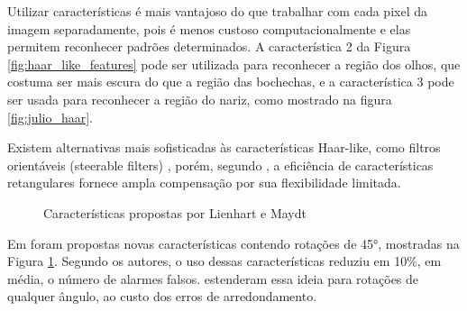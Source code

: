 Utilizar características é mais vantajoso do que trabalhar com cada pixel da imagem separadamente, pois é menos custoso computacionalmente e elas permitem reconhecer padrões determinados. A característica 2 da Figura \ref{fig:haar_like_features} pode ser utilizada para reconhecer a região dos olhos, que costuma ser mais escura do que a região das bochechas, e a característica 3 pode ser usada para reconhecer a região do nariz, como mostrado na figura \ref{fig:julio_haar}.

Existem alternativas mais sofisticadas às características Haar-like, como filtros orientáveis (steerable filters) \cite{freeman1991design} \cite{greenspan1994overcomplete}, porém, segundo , a eficiência de características retangulares fornece ampla compensação por sua flexibilidade limitada.

\begin{figure}[htbp]
   \begin{center}
   \end{center}
   \caption{Características propostas por Lienhart e Maydt \label{lienhart_haar_features}}
\end{figure}

Em  foram propostas novas características contendo rotações de \ang{45}, mostradas na Figura \ref{lienhart_haar_features}. Segundo os autores, o uso dessas características reduziu em 10\%, em média, o número de alarmes falsos.  estenderam essa ideia para rotações de qualquer ângulo, ao custo dos erros de arredondamento.

